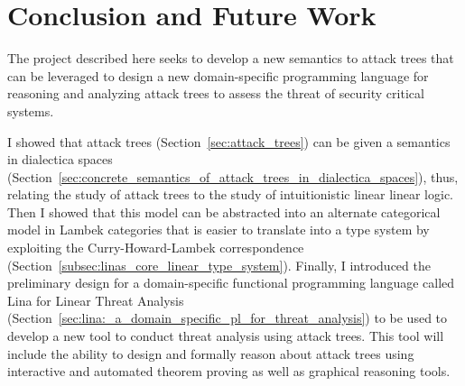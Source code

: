 \documentclass{sigplanconf}
\begin{document}

\section{Conclusion and Future Work}
\label{sec:conclusion}

The project described here seeks to develop a new semantics to attack
trees that can be leveraged to design a new domain-specific
programming language for reasoning and analyzing attack trees to assess
the threat of security critical systems.

I showed that attack trees (Section~\ref{sec:attack_trees}) can be
given a semantics in dialectica spaces
(Section~\ref{sec:concrete_semantics_of_attack_trees_in_dialectica_spaces}),
thus, relating the study of attack trees to the study of
intuitionistic linear linear logic.  Then I showed that this model can
be abstracted into an alternate categorical model in Lambek categories
that is easier to translate into a type system by exploiting the
Curry-Howard-Lambek correspondence
(Section~\ref{subsec:linas_core_linear_type_system}).  Finally, I
introduced the preliminary design for a domain-specific functional
programming language called Lina for Linear Threat Analysis
(Section~\ref{sec:lina:_a_domain_specific_pl_for_threat_analysis}) to
be used to develop a new tool to conduct threat analysis using attack
trees.  This tool will include the ability to design and formally
reason about attack trees using interactive and automated theorem
proving as well as graphical reasoning tools.
\end{document}

